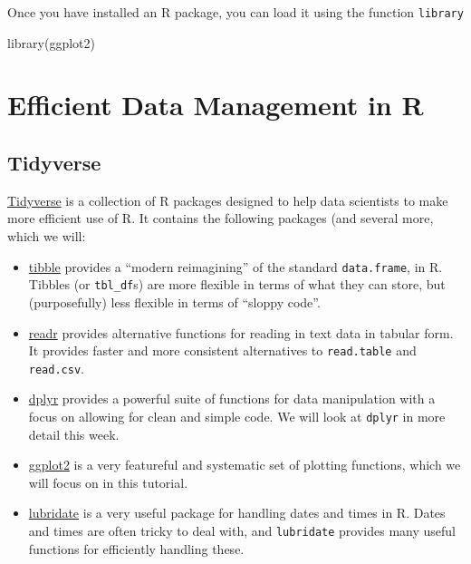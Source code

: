 \documentclass[
]{book}
\newenvironment{Shaded}{\begin{snugshade}}{\end{snugshade}}
\newcommand{\FunctionTok}[1]{\textcolor[rgb]{0.00,0.00,0.00}{#1}}
\newcommand{\NormalTok}[1]{#1}
\providecommand{\tightlist}{%
  \setlength{\itemsep}{0pt}\setlength{\parskip}{0pt}}
\begin{document}
Once you have installed an R package, you can load it using the function \texttt{library}

\begin{Shaded}
\begin{Highlighting}[]
\FunctionTok{library}\NormalTok{(ggplot2)}
\end{Highlighting}
\end{Shaded}

\hypertarget{efficient-data-management-in-r}{%
\chapter{Efficient Data Management in R}\label{efficient-data-management-in-r}}

\hypertarget{tidyverse}{%
\section{Tidyverse}\label{tidyverse}}

\href{https://www.tidyverse.org/}{Tidyverse} is a collection of R packages designed to help data scientists to make more efficient use of R. It contains the following packages (and several more, which we will:

\begin{itemize}
\tightlist
\item
  \href{http://tibble.tidyverse.org/}{tibble} provides a ``modern reimagining'' of the standard \texttt{data.frame}, in R. Tibbles (or \texttt{tbl\_df}s) are more flexible in terms of what they can store, but (purposefully) less flexible in terms of ``sloppy code''.
\item
  \href{http://readr.tidyverse.org/}{readr} provides alternative functions for reading in text data in tabular form. It provides faster and more consistent alternatives to \texttt{read.table} and \texttt{read.csv}.
\item
  \href{http://dplyr.tidyverse.org/}{dplyr} provides a powerful suite of functions for data manipulation with a focus on allowing for clean and simple code. We will look at \texttt{dplyr} in more detail this week.
\item
  \href{http://ggplot2.tidyverse.org/}{ggplot2} is a very featureful and systematic set of plotting functions, which we will focus on in this tutorial.
\item
  \href{https://lubridate.tidyverse.org/}{lubridate} is a very useful package for handling dates and times in R. Dates and times are often tricky to deal with, and \texttt{lubridate} provides many useful functions for efficiently handling these.
\end{itemize}
\end{document}
